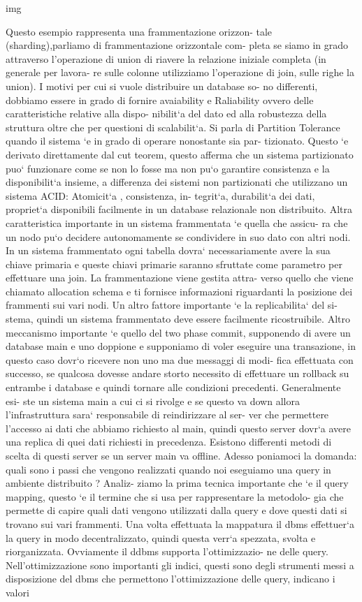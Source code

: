 img


Questo esempio rappresenta una frammentazione orizzon- tale (sharding),parliamo di frammentazione orizzontale com- pleta se siamo in grado attraverso l’operazione di union di riavere la relazione iniziale completa (in generale per lavora- re sulle colonne utilizziamo l’operazione di join, sulle righe la union). I motivi per cui si vuole distribuire un database so- no differenti, dobbiamo essere in grado di fornire avaiability e Raliability ovvero delle caratteristiche relative alla dispo- nibilit`a del dato ed alla robustezza della struttura oltre che per questioni di scalabilit`a. Si parla di Partition Tolerance quando il sistema `e in grado di operare nonostante sia par- tizionato. Questo `e derivato direttamente dal cut teorem, questo afferma che un sistema partizionato puo` funzionare come se non lo fosse ma non pu`o garantire consistenza e la disponibilit`a insieme, a differenza dei sistemi non partizionati che utilizzano un sistema ACID: Atomicit`a , consistenza, in- tegrit`a, durabilit`a dei dati, propriet`a disponibili facilmente in un database relazionale non distribuito. Altra caratteristica importante in un sistema frammentata `e quella che assicu- ra che un nodo pu`o decidere autonomamente se condividere in suo dato con altri nodi. In un sistema frammentato ogni tabella dovra` necessariamente avere la sua chiave primaria e queste chiavi primarie saranno sfruttate come parametro per effettuare una join. La frammentazione viene gestita attra- verso quello che viene chiamato allocation schema e ti fornisce informazioni riguardanti la posizione dei frammenti sui vari nodi. Un altro fattore importante `e la replicabilita` del si- stema, quindi un sistema frammentato deve essere facilmente ricostruibile. Altro meccanismo importante `e quello del two phase commit, supponendo di avere un database main e uno doppione e supponiamo di voler eseguire una transazione, in questo caso dovr`o ricevere non uno ma due messaggi di modi- fica effettuata con successo, se qualcosa dovesse andare storto necessito di effettuare un rollback su entrambe i database e quindi tornare alle condizioni precedenti. Generalmente esi- ste un sistema main a cui ci si rivolge e se questo va down allora l’infrastruttura sara` responsabile di reindirizzare al ser- ver che permettere l’accesso ai dati che abbiamo richiesto al main, quindi questo server dovr`a avere una replica di quei dati richiesti in precedenza. Esistono differenti metodi di scelta di questi server se un server main va offline. Adesso poniamoci la domanda: quali sono i passi che vengono realizzati quando noi eseguiamo una query in ambiente distribuito ? Analiz- ziamo la prima tecnica importante che `e il query mapping, questo `e il termine che si usa per rappresentare la metodolo- gia che permette di capire quali dati vengono utilizzati dalla query e dove questi dati si trovano sui vari frammenti. Una volta effettuata la mappatura il dbms effettuer`a la query in modo decentralizzato, quindi questa verr`a spezzata, svolta e riorganizzata. Ovviamente il ddbms supporta l’ottimizzazio- ne delle query. Nell’ottimizzazione sono importanti gli indici, questi sono degli strumenti messi a disposizione del dbms che permettono l’ottimizzazione delle query, indicano i valori 